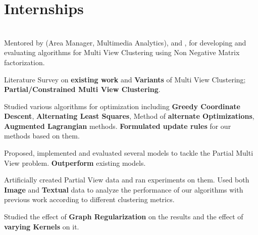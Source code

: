 \documentclass[a4paper]{norm-resume}
\begin{document}
\vspace{1mm}	%


\section{Internships \hrulefill}
		
\vspace{2mm} %
		
				

\vspace{-2mm} %

	\begin{changemargin}{1.0cm}{0.0cm} 
	{
	\large{}  \\
	\small{Mentored by  (Area Manager, Multimedia Analytics),  and , for developing and evaluating algorithms for Multi View Clustering using Non Negative Matrix factorization.}
	\begin{tightitemize}
	\small
	{ 	
	\item Literature Survey on \textbf{existing work} and \textbf{Variants} of Multi View Clustering; \textbf{Partial/Constrained Multi View Clustering}.
	\item Studied various algorithms for optimization including \textbf{Greedy Coordinate Descent}, \textbf{Alternating Least Squares}, Method of \textbf{alternate Optimizations}, \textbf{Augmented Lagrangian} methods. \textbf{Formulated update rules} for our methods based on them.
	\item Proposed, implemented and evaluated several models to tackle the Partial Multi View problem. \textbf{Outperform} existing models.
	\item Artificially created Partial View data and ran experiments on them. Used both \textbf{Image} and \textbf{Textual} data to analyze the performance of our algorithms with previous work according to different clustering metrics.
	\item Studied the effect of \textbf{Graph Regularization} on the results and the effect of \textbf{varying Kernels} on it. 	
	}
	\end{tightitemize}	
	}
	\end{changemargin} 	
	
\end{document}
